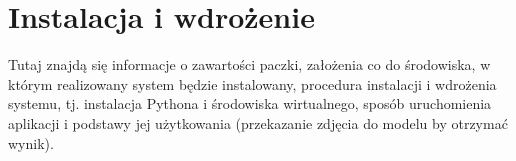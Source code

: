 \chapter{Instalacja i wdrożenie}
\thispagestyle{chapterBeginStyle}

Tutaj znajdą się informacje o zawartości paczki, założenia co do środowiska, w którym realizowany system będzie instalowany, procedura instalacji i wdrożenia systemu, tj. instalacja Pythona i środowiska wirtualnego, sposób uruchomienia aplikacji i podstawy jej użytkowania (przekazanie zdjęcia do modelu by otrzymać wynik).


